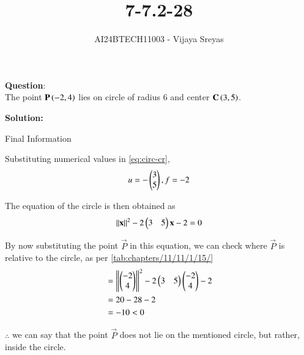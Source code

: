\documentclass[journal]{IEEEtran}
\begin{document}

\vspace{3cm}

\title{7-7.2-28}
\author{AI24BTECH11003 - Vijaya Sreyas
}
{\let\newpage\relax\maketitle}

\renewcommand{\thefigure}{\theenumi}
\renewcommand{\thetable}{\theenumi}
\setlength{\intextsep}{10pt} %


\renewcommand{\thetable}{\theenumi}


\textbf{Question}:\\
The point $\mathbf{P}\left(-2,4\right)$ lies on circle of radius 6 and center $\mathbf{C}\left(3,5\right)$.

\textbf{Solution: }

\begin{table}[h!]    
  \centering
  
  \caption{Final Information}
  \label{7-7.2-28-tab-0}
\end{table}

Substituting numerical values in \eqref{eq:circ-cr},
\begin{align}
    u=-\begin{pmatrix}3 \\ 5\end{pmatrix}, f=-2
\end{align}

The equation of the circle is then obtained as
\begin{align}
    \left\lVert\mathbf{x}\right\rVert^2 -2\begin{pmatrix}3 & 5\end{pmatrix}\mathbf{x} -2 = 0
\end{align}

By now substituting the point $\vec{P}$ in this equation, we can check where $\vec{P}$ is relative to the circle, as per \eqref{tab:chapters/11/11/1/15/}
\begin{align}
    &= \left\lVert\begin{pmatrix}-2 \\ 4\end{pmatrix}\right\rVert^2-2\begin{pmatrix}3 & 5\end{pmatrix}\begin{pmatrix}-2 \\ 4\end{pmatrix} -2 \\
    &= 20 - 28 - 2 \\
    &= -10 < 0
\end{align}

$\therefore$ we can say that the point $\vec{P}$ does not lie on the mentioned circle, but rather, inside the circle.
\end{document}
